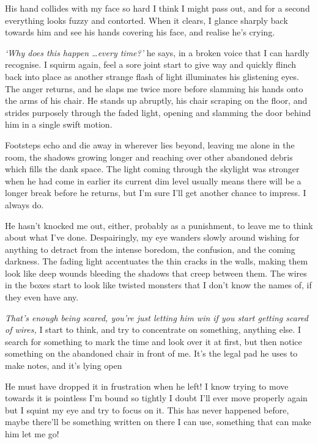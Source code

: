 \noindent
His hand collides with my face so hard I think I might pass out, and
for a second everything looks fuzzy and contorted. When it clears, I
glance sharply back towards him and see his hands covering his face,
and realise he's crying.

\textit{`Why does this happen \ldots every time?'} he says, in a
broken voice that I can hardly recognise. I squirm again, feel a sore
joint start to give way and quickly flinch back into place as another
strange flash of light illuminates his glistening eyes. The anger
returns, and he slaps me twice more before slamming his hands onto the
arms of his chair. He stands up abruptly, his chair scraping on the
floor, and strides purposely through the faded light, opening and
slamming the door behind him in a single swift motion.

Footsteps echo and die away in wherever lies beyond, leaving me alone
in the room, the shadows growing longer and reaching over other
abandoned debris which fills the dank space. The light coming through
the skylight was stronger when he had come in earlier \textemdash{}
its current dim level usually means there will be a longer break
before he returns, but I'm sure I'll get another chance to impress. I
always do.

He hasn't knocked me out, either, probably as a punishment, to leave
me to think about what I've done. Despairingly, my eye wanders slowly
around wishing for anything to detract from the intense boredom, the
confusion, and the coming darkness. The fading light accentuates the
thin cracks in the walls, making them look like deep wounds bleeding
the shadows that creep between them. The wires in the boxes start to
look like twisted monsters that I don't know the names of, if they
even have any.

\textit{That's enough being scared, you're just letting him win if
you start getting scared of wires,} I start to think, and try to
concentrate on something, anything else. I search for something to
mark the time and look over it at first, but then notice something on
the abandoned chair in front of me. It's the legal pad he uses to make
notes, and it's lying open \textemdash{}

He must have dropped it in frustration when he left! I know trying to
move towards it is pointless \textemdash{} I'm bound so tightly I
doubt I'll ever move properly again \textemdash{} but I squint my eye
and try to focus on it. This has never happened before, maybe there'll
be something written on there I can use, something that can make him
let me go!

